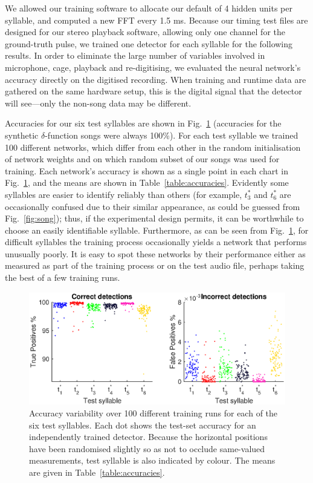 \documentclass[10pt,letterpaper]{article}
\newcommand\fig[1]{Fig.~\ref{#1}}
\begin{document}
We allowed our training software to allocate our default of 4 hidden
units per syllable, and computed a new FFT every 1.5 ms.  Because our
timing test files are designed for our stereo playback software,
allowing only one channel for the ground-truth pulse, we trained one
detector for each syllable for the following results.  In order to
eliminate the large number of variables involved in microphone, cage,
playback and re-digitising, we evaluated the neural network's accuracy
directly on the digitised recording.  When training and runtime data
are gathered on the same hardware setup, this is the digital signal
that the detector will see---only the non-song data may be different.

Accuracies for our six test syllables are shown in
\fig{fig:accuracies} (accuracies for the synthetic $\delta$-function
songs were always 100\%).  For each test syllable we trained 100
different networks, which differ from each other in the random
initialisation of network weights and on which random subset of our
songs was used for training.  Each network's accuracy is shown as a
single point in each chart in \fig{fig:accuracies}, and the means are
shown in Table~\ref{table:accuracies}.  Evidently some syllables are
easier to identify reliably than others (for example, $t^*_3$ and
$t^*_6$ are occasionally confused due to their similar appearance, as
could be guessed from \fig{fig:song}); thus, if the experimental
design permits, it can be worthwhile to choose an easily identifiable
syllable.  Furthermore, as can be seen from \fig{fig:accuracies}, for
difficult syllables the training process occasionally yields a network
that performs unusually poorly.  It is easy to spot these networks by
their performance either as measured as part of the training process
or on the test audio file, perhaps taking the best of a few training
runs.

\begin{figure}
  \includegraphics[width=\textwidth]{Fig3}
  
  \caption{Accuracy variability over 100 different training runs for
    each of the six test syllables.  Each dot shows the test-set
    accuracy for an independently trained detector.  Because the
    horizontal positions have been randomised slightly so as not to
    occlude same-valued measurements, test syllable is also indicated
    by colour.  The means are given in Table~\ref{table:accuracies}.}
  \label{fig:accuracies}
\end{figure}
\end{document}
